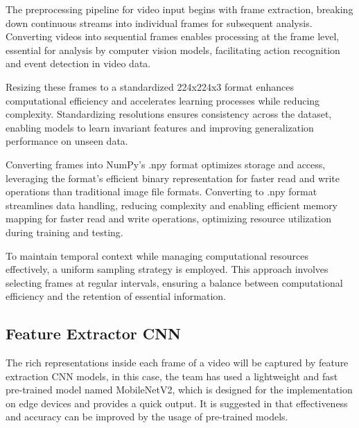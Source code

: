 \noindent The preprocessing pipeline for video input begins with frame extraction, breaking down continuous streams into individual frames for subsequent analysis. Converting videos into sequential frames enables processing at the frame level, essential for analysis by computer vision models, facilitating action recognition and event detection in video data.

\noindent Resizing these frames to a standardized 224x224x3 format enhances computational efficiency and accelerates learning processes while reducing complexity. Standardizing resolutions ensures consistency across the dataset, enabling models to learn invariant features and improving generalization performance on unseen data. 

\noindent Converting frames into NumPy's .npy format optimizes storage and access, leveraging the format's efficient binary representation for faster read and write operations than traditional image file formats. Converting to .npy format streamlines data handling, reducing complexity and enabling efficient memory mapping for faster read and write operations, optimizing resource utilization during training and testing.

\noindent To maintain temporal context while managing computational resources effectively, a uniform sampling strategy is employed. This approach involves selecting frames at regular intervals, ensuring a balance between computational efficiency and the retention of essential information.


\subsection{Feature Extractor CNN}

\noindent The rich representations inside each frame of a video will be captured by feature extraction CNN models, in this case, the team has used a lightweight and fast pre-trained model named MobileNetV2, which is designed for the implementation on edge devices and provides a quick output. It is suggested in \cite{renjith_sir_paper} that effectiveness and accuracy can be improved by the usage of pre-trained models. 

